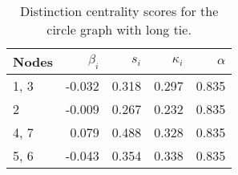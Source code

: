 \begin{table}
\centering
\caption{\label{tab:circlelong}Distinction centrality scores for the circle graph with long tie.}
\centering
\begin{tabular}[t]{lrrrr}
\toprule
Nodes & $\beta_i$ & $s_i$ & $\kappa_i$ & $\alpha$\\
\midrule
1, 3 & -0.032 & 0.318 & 0.297 & 0.835\\
2 & -0.009 & 0.267 & 0.232 & 0.835\\
4, 7 & 0.079 & 0.488 & 0.328 & 0.835\\
5, 6 & -0.043 & 0.354 & 0.338 & 0.835\\
\bottomrule
\end{tabular}
\end{table}
